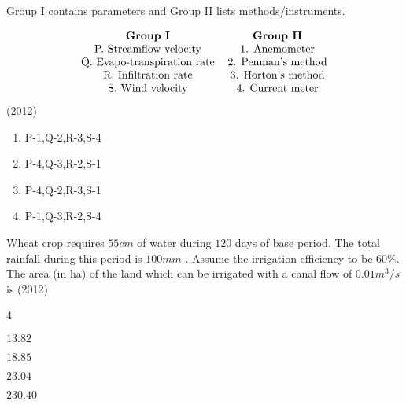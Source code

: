 \iffalse
\chapter{2012}
\author{AI24BTECH11004}

\section{ce}
\fi

       \item Group I contains parameters and Group II lists methods/instruments.
	       
        \begin{align*}
             \begin{tabular}{c c}
                \textbf{Group I} & \textbf{Group II}\\
                P. Streamflow velocity  &  1. Anemometer\\
                    Q. Evapo-transpiration rate & 2. Penman's method \\
                R. Infiltration rate& 3. Horton's method\\
                S. Wind velocity&4. Current meter
             \end{tabular}
             \end{align*}
             \hfill{(2012)}
             \begin{enumerate}
             \item P-1,Q-2,R-3,S-4
             \item P-4,Q-3,R-2,S-1
             \item P-4,Q-2,R-3,S-1
             \item P-1,Q-3,R-2,S-4
        	\end{enumerate}	
	\item Wheat crop requires $55 cm$ of water during $120$ days of base period. The total rainfall during this period is $100 mm$ . Assume the irrigation efficiency to be $60 \%$. The area (in ha) of the land which can be irrigated with a canal flow of $0.01m^3/s$ is 
	\hfill{(2012)}
               \begin{enumerate}
	       \end{enumerate}	
